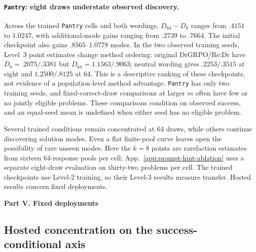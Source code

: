 \documentclass{article}
\newcommand{\1}{\mathbf 1}
\theoremstyle{remark}
\theoremstyle{definition}
\theoremstyle{plain}
\begin{document}
\paragraph{\texttt{Pantry}: eight draws understate observed discovery.}
Across the trained \texttt{Pantry} cells and both wordings, $D_{64}-D_8$ ranges
from $.4151$ to $1.0247$, with additional-mode gains ranging from $.2739$
to $.7664$. The initial checkpoint also gains $.8565$--$1.0778$ modes.
In the two observed training seeds, Level~3 point estimates change
method ordering: original DrGRPO/Re:Dr have $D_8=.2075/.3381$
but $D_{64}=1.1563/.9063$; neutral wording gives $.2253/.3515$ at eight
and $1.2500/.8125$ at 64. This is a descriptive ranking of these checkpoints,
not evidence of a population-level method advantage. \texttt{Pantry} has only two
training seeds, and fixed-correct-draw comparisons at larger $m$ often have
few or no jointly eligible problems. These comparisons condition on observed
success, and an equal-seed mean is undefined when either seed has no eligible
problem.

Several trained conditions remain concentrated at 64 draws, while others
continue discovering solution modes. Even a flat finite-pool curve leaves
open the possibility of rare unseen modes. Here the $k=8$ points are
rarefaction estimates from sixteen 64-response pools per cell; App.~\ref{app:prompt-hint-ablation}
uses a separate eight-draw evaluation on thirty-two problems per cell.
The trained checkpoints use Level-2 training, so their Level-3 results
measure transfer. Hosted results concern fixed deployments.






\clearpage
{}
\begin{center}\large\textbf{Part V. Fixed deployments}\end{center}



\subsection{Hosted concentration on the success-conditional axis}
\label{app:hosted-mode-diversity}
\end{document}
